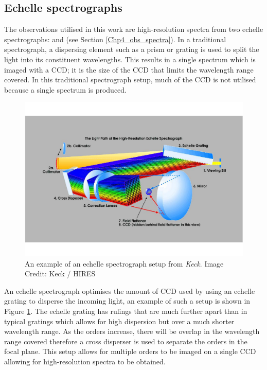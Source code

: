 \subsection{Echelle spectrographs}

The observations utilised in this work are high-resolution spectra from two echelle spectrographs: \esp and \narval (see Section \ref{Chp4_obs_spectra}). In a traditional spectrograph, a dispersing element such as a prism or grating is used to split the light into its constituent wavelengths. This results in a single spectrum which is imaged with a CCD; it is the size of the CCD that limits the wavelength range covered. In this traditional spectrograph setup, much of the CCD is not utilised because a single spectrum is produced.

\begin{figure}
    \centering
    \includegraphics[scale=0.55]{Figures/4-Chromospheric_age/HIRES_diagram.pdf}
    \caption[Example of echelle spectrograph]{An example of an echelle spectrograph setup from \textit{Keck}. Image Credit: Keck / HIRES}
    \label{fig:echelle_diagram}
\end{figure}

An echelle spectrograph optimises the amount of CCD used by using an echelle grating to disperse the incoming light, an example of such a setup is shown in Figure \ref{fig:echelle_diagram}. The echelle grating has rulings that are much further apart than in typical gratings which allows for high dispersion but over a much shorter wavelength range. As the orders increase, there will be overlap in the wavelength range covered therefore a cross disperser is used to separate the orders in the focal plane. This setup allows for multiple orders to be imaged on a single CCD allowing for high-resolution spectra to be obtained.

